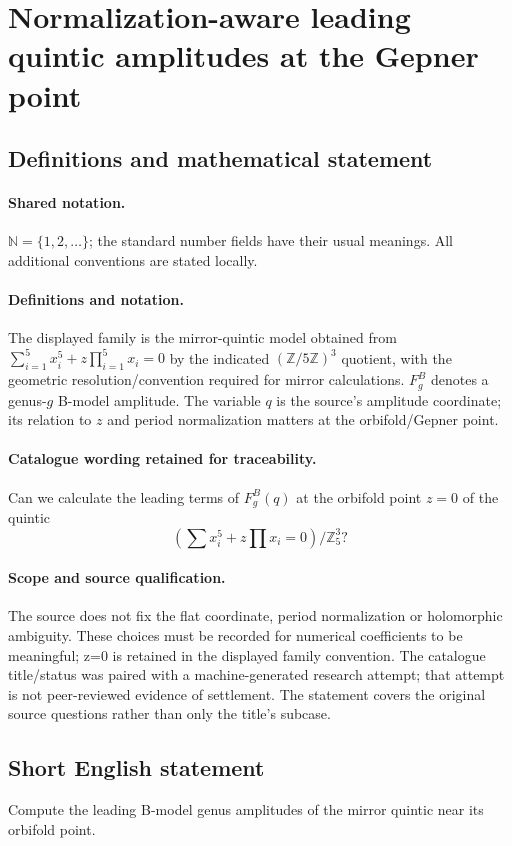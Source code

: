 \documentclass[11pt]{article}
\begin{document}
\section{Normalization-aware leading quintic amplitudes at the Gepner point}\label{statement}

\subsection{Definitions and mathematical statement}

\paragraph{Shared notation.}$\mathbb N=\{1,2,\ldots\}$; the standard number fields have their usual meanings. All additional conventions are stated locally.


\paragraph{Definitions and notation.}The displayed family is the mirror-quintic model obtained from $\sum_{i=1}^5x_i^5+z\prod_{i=1}^5x_i=0$ by the indicated $(\mathbb Z/5\mathbb Z)^3$ quotient, with the geometric resolution/convention required for mirror calculations. $F_g^B$ denotes a genus-$g$ B-model amplitude. The variable $q$ is the source’s amplitude coordinate; its relation to $z$ and period normalization matters at the orbifold/Gepner point.

\paragraph{Catalogue wording retained for traceability.}
Can we calculate the leading terms of $F_g^B(q)$ at the orbifold point $z=0$ of the quintic
\[
(\sum x_i^5 + z \prod x_i =0 )/ \mathbb{Z}_5^3?
\]
\paragraph{Scope and source qualification.}The source does not fix the flat coordinate, period normalization or holomorphic ambiguity. These choices must be recorded for numerical coefficients to be meaningful; z=0 is retained in the displayed family convention. The catalogue title/status was paired with a machine-generated research attempt; that attempt is not peer-reviewed evidence of settlement. The statement covers the original source questions rather than only the title’s subcase.
\subsection{Short English statement}
Compute the leading B-model genus amplitudes of the mirror quintic near its orbifold point.
\end{document}
